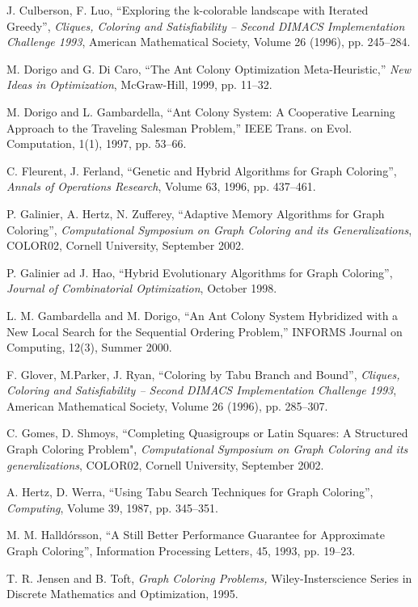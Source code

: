 \documentclass[11pt]{article}
\begin{document}
\begin{thebibliography}{99}
J. Culberson, F. Luo,
``Exploring the k-colorable landscape with Iterated Greedy'',
{\it Cliques, Coloring and Satisfiability -- Second DIMACS Implementation
Challenge 1993}, American Mathematical Society, Volume 26 (1996), pp. 
245--284.

M. Dorigo and G. Di Caro,
``The Ant Colony Optimization Meta-Heuristic,''
{\it New Ideas in Optimization}, McGraw-Hill, 1999, pp. 11--32.


M. Dorigo and L. Gambardella,
``Ant Colony System: A Cooperative Learning Approach to the Traveling
Salesman Problem,''
IEEE Trans. on Evol. Computation, 1(1), 1997, pp. 53--66.

C. Fleurent, J. Ferland,
``Genetic and Hybrid Algorithms for Graph Coloring'',
{\it Annals of Operations Research}, Volume 63, 1996, pp. 437--461.

P. Galinier, A. Hertz, N. Zufferey,
``Adaptive Memory Algorithms for Graph Coloring'',
{\it Computational Symposium on Graph Coloring and its Generalizations}, 
COLOR02,
Cornell University, September 2002.

P. Galinier ad J. Hao,
``Hybrid Evolutionary Algorithms for Graph Coloring'',
{\it Journal of Combinatorial Optimization}, October 1998.

L. M. Gambardella and  M. Dorigo,
``An Ant Colony System Hybridized with a New Local Search for the Sequential
Ordering Problem,''
INFORMS Journal on Computing, 12(3), Summer 2000.


F. Glover, M.Parker, J. Ryan,
``Coloring by Tabu Branch and Bound'',
{\it Cliques, Coloring and Satisfiability -- Second DIMACS Implementation
Challenge 1993}, American Mathematical Society, Volume 26 (1996), pp. 
285--307.

C. Gomes, D. Shmoys,
``Completing Quasigroups or Latin Squares: A Structured Graph Coloring
Problem",
{\it Computational Symposium on Graph Coloring and its generalizations}, 
COLOR02,
Cornell University, September 2002.

A. Hertz, D. Werra,
``Using Tabu Search Techniques for Graph Coloring'',
{\it Computing}, Volume 39, 1987, pp. 345--351.

M. M. Halld\'orsson,
``A Still Better Performance Guarantee for Approximate Graph Coloring'',
Information Processing Letters, 45, 1993, pp. 19--23.


T. R. Jensen and B. Toft,
{\it Graph Coloring Problems,} Wiley-Insterscience Series in Discrete
Mathematics and Optimization, 1995.



\end{thebibliography}
\end{document}
